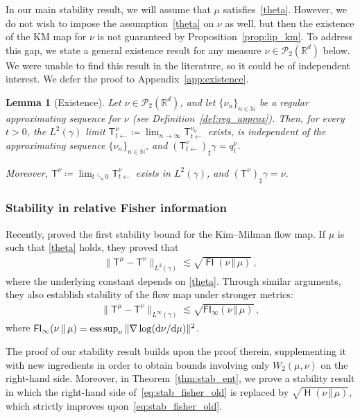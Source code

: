 \documentclass[12pt]{article}
\newcommand{\cP}{\mathcal{P}}
\newcommand{\RR}{\mathbb{R}}
\newcommand{\R}{\RR}
\newcommand{\N}{\mathbb{N}}
\newcommand{\1}{\mathds{1}}
\newcommand*{\rd}{\mathrm{d}}
\newcommand*{\dd}{\, \rd}
\newcommand{\mmid}{\,\Vert\,}
\newcommand{\deq}{\coloneqq}
\DeclareMathOperator*{\KL}{\mathsf{H}}
\DeclareMathOperator*{\FI}{\mathsf{FI}}
\newcommand{\KM}{\mathsf T}
\theoremstyle{plain}
\newtheorem{lemma}[theorem]{Lemma}
\theoremstyle{definition}
\theoremstyle{remark}
\begin{document}
In our main stability result, we will assume that $\mu$ satisfies~\eqref{theta}. However, we do not wish to impose the assumption~\eqref{theta} on $\nu$ as well, but then the existence of the KM map for $\nu$ is not guaranteed by Proposition~\ref{prop:lip_km}. To address this gap, we state a general existence result for any measure $\nu \in \cP_2(\R^d)$ below. We were unable to find this result in the literature, so it could be of independent interest. We defer the proof to Appendix~\ref{app:existence}.

\begin{lemma}[Existence]\label{lem:existence_km}
    Let $\nu \in \cP_2(\R^d)$, and let $\{\nu_n\}_{n\in\N}$ be a regular approximating sequence for $\nu$ (see Definition~\ref{def:reg_approx}).
    Then, for every $t > 0$, the $L^2(\gamma)$ limit $\KM^\nu_{t\gets} \deq \lim_{n\to\infty} \KM^{\nu_n}_{t\gets}$ exists, is independent of the approximating sequence $\{\nu_n\}_{n\in\N}$, and $(\KM^\nu_{t\gets})_\sharp \gamma = q_t^\nu$.

    Moreover, $\KM^\nu \deq \lim_{t\searrow 0} \KM^\nu_{t\gets}$ exists in $L^2(\gamma)$, and $(\KM^\nu)_\sharp \gamma = \nu$.
\end{lemma}


\subsubsection{Stability in relative Fisher information}


Recently, \cite{chewi2025stability} proved the first stability bound for the Kim--Milman flow map. If $\mu$ is such that \eqref{theta} holds, they proved that 
\begin{align}\label{eq:stab_fisher_old}
    \|\mathsf T^{\mu} - \mathsf T^{\nu}\|_{L^2(\gamma)}\lesssim \sqrt{\FI(\nu\mmid\mu)}\,,
\end{align}
where the underlying constant depends on \eqref{theta}. Through similar arguments, they also establish stability of the flow map under stronger metrics:
\begin{align*}
    \|\mathsf T^{\mu} - \mathsf T^{\nu}\|_{L^\infty(\gamma)}\lesssim \sqrt{{\mathsf{FI}}_\infty(\nu\mmid\mu)}\,,
\end{align*}
where $\FI_\infty(\nu\mmid\mu) = {\rm ess} \sup_\nu\|\nabla \log (\!\dd\nu/\!\dd\mu)\|^2$.

The proof of our stability result builds upon the proof therein, supplementing it with new ingredients in order to obtain bounds involving only $W_2(\mu,\nu)$ on the right-hand side. Moreover, in Theorem~\ref{thm:stab_ent}, we prove a stability result in which the right-hand side of~\eqref{eq:stab_fisher_old} is replaced by $\sqrt{\KL(\nu\mmid \mu)}$, which strictly improves upon~\eqref{eq:stab_fisher_old}.
\end{document}
